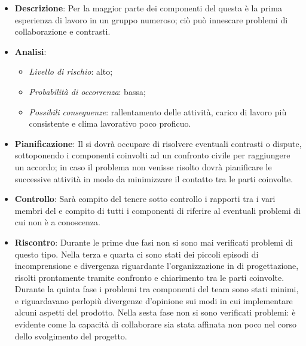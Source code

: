 			\begin{itemize}
				\item \textbf{Descrizione}: Per la maggior parte dei componenti del  questa è la prima esperienza di lavoro in un gruppo numeroso; ciò può  innescare problemi di collaborazione e contrasti.
				\item \textbf{Analisi}:
				\begin{itemize}
					\item \textit{Livello di rischio}: alto;
					\item \textit{Probabilità di occorrenza}: bassa;
					\item \textit{Possibili conseguenze}: rallentamento delle attività, carico di lavoro più consistente e clima lavorativo poco proficuo.
				\end{itemize}
				\item \textbf{Pianificazione}: Il  si dovrà occupare di risolvere eventuali contrasti o dispute, sottoponendo i componenti coinvolti ad un confronto civile per raggiungere un accordo; in caso il problema non venisse risolto dovrà pianificare le successive attività in modo da minimizzare il contatto tra le parti coinvolte.
				\item \textbf{Controllo}: Sarà compito del  tenere sotto controllo i rapporti tra i vari membri del  e compito di tutti i componenti di riferire al  eventuali problemi di cui non è a conoscenza.
				\item \textbf{Riscontro}: Durante le prime due fasi non si sono mai verificati problemi di questo tipo. Nella terza e quarta  ci sono stati dei piccoli episodi di incomprensione e divergenza riguardante l’organizzazione in  di progettazione, risolti prontamente tramite confronto e chiarimento tra le parti coinvolte. Durante la quinta fase i problemi tra componenti del team sono stati minimi, e riguardavano perlopiù divergenze d'opinione sui modi in cui implementare alcuni aspetti del prodotto. Nella sesta fase non si sono verificati problemi: è evidente come la capacità di collaborare sia stata affinata non poco nel corso dello svolgimento del progetto.
			\end{itemize}
